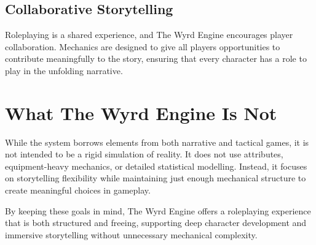 
\subsection{Collaborative Storytelling}
Roleplaying is a shared experience, and The Wyrd Engine encourages player collaboration. Mechanics are designed to give all players opportunities to contribute meaningfully to the story, ensuring that every character has a role to play in the unfolding narrative.

\section{What The Wyrd Engine Is Not}
While the system borrows elements from both narrative and tactical games, it is not intended to be a rigid simulation of reality. It does not use attributes, equipment-heavy mechanics, or detailed statistical modelling. Instead, it focuses on storytelling flexibility while maintaining just enough mechanical structure to create meaningful choices in gameplay.

By keeping these goals in mind, The Wyrd Engine offers a roleplaying experience that is both structured and freeing, supporting deep character development and immersive storytelling without unnecessary mechanical complexity.
